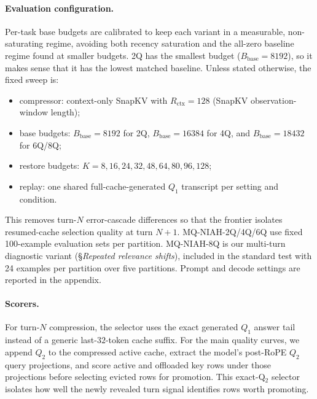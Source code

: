 \documentclass{article}
\newcommand{\bbase}{\ensuremath{B_{\mathrm{base}}}}
\begin{document}
\paragraph{Evaluation configuration.}
Per-task base budgets are calibrated to keep each variant
in a measurable, non-saturating regime, avoiding both recency saturation
and the all-zero baseline regime found at smaller budgets. 2Q has the
smallest budget ($\bbase=8192$), so it makes sense that it has the
lowest matched baseline.
Unless stated otherwise, the fixed sweep is:
\begin{itemize}[leftmargin=1.4em,noitemsep,topsep=2pt]
  \item compressor: context-only SnapKV with
  $R_{\mathrm{ctx}}=128$ (SnapKV observation-window length);
  \item base budgets: $\bbase=8192$ for 2Q, $\bbase=16384$ for 4Q, and
  $\bbase=18432$ for 6Q/8Q;
  \item restore budgets: $K=8,16,24,32,48,64,80,96,128$;
  \item replay: one shared full-cache-generated $Q_1$ transcript per
  setting and condition.
\end{itemize}
This removes turn-$N$ error-cascade differences so that the frontier
isolates resumed-cache selection quality at turn $N{+}1$.
MQ-NIAH-2Q/4Q/6Q use fixed 100-example evaluation sets per partition.
MQ-NIAH-8Q is our multi-turn diagnostic variant
(\S\textit{Repeated relevance shifts}), included in the standard test
with 24 examples per partition over five partitions.
Prompt and decode settings are reported in the appendix.

\paragraph{Scorers.}
For turn-$N$ compression, the selector uses the exact generated $Q_1$
answer tail instead of a generic last-$32$-token cache suffix.
For the main quality curves, we append $Q_2$ to the compressed active
cache, extract the model's post-RoPE $Q_2$ query projections, and score
active and offloaded key rows under those projections before selecting
evicted rows for promotion. This exact-Q$_2$ selector isolates
how well the newly revealed turn signal identifies rows
worth promoting.
\end{document}
